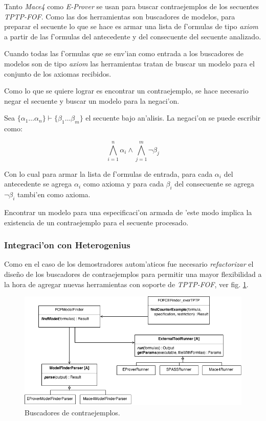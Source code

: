 Tanto \textit{Mace4} como \textit{E-Prover} se usan para buscar contraejemplos de los secuentes \textit{TPTP-FOF}. Como las dos herramientas son buscadores de modelos, para preparar el secuente lo que se hace es armar una lista de f'ormulas de tipo \textit{axiom} a partir de las f'ormulas del antecedente y del consecuente del secuente analizado.

Cuando todas las f'ormulas que se env'ian como entrada a los buscadores de modelos son de tipo \textit{axiom} las herramientas tratan de buscar un modelo para el conjunto de los axiomas recibidos.

Como lo que se quiere lograr es encontrar un contraejemplo, se hace necesario negar el secuente y buscar un modelo para la negaci'on.

Sea $\{\alpha_1 \dots \alpha_n\} \vdash \{\beta_1 \dots \beta_m\}$ el secuente bajo an'alisis.
La negaci'on se puede escribir como:

\begin{equation}
\bigwedge\limits_{i=1}^n{\alpha_i} \wedge \bigwedge\limits_{j=1}^m{\neg \beta_{j}}
\end{equation}

Con lo cual para armar la lista de f'ormulas de entrada, para cada $\alpha_{i}$ del antecedente se agrega $\alpha_{i}$ como axioma y para cada $\beta_{i}$ del consecuente se agrega $\neg \beta_{i}$ tambi'en como axioma.

Encontrar un modelo para una especificaci'on armada de 'este modo implica la existencia de un contraejemplo para el secuente procesado.


\subsubsection{Integraci'on con Heterogenius}

Como en el caso de los demostradores autom'aticos fue necesario \textit{refactorizar} el diseño de los buscadores de contraejemplos para permitir una mayor flexibilidad a la hora de agregar nuevas herramientas con soporte de \textit{TPTP-FOF}, ver fig. \ref{diagramaclasesbuscadorescontraejemplos}.

\begin{figure}[]
	\includegraphics[width=450px, angle=90]{img/arq_ce.png}
	\centering
	\caption{Buscadores de contraejemplos.}
	\label{diagramaclasesbuscadorescontraejemplos}
\end{figure}

